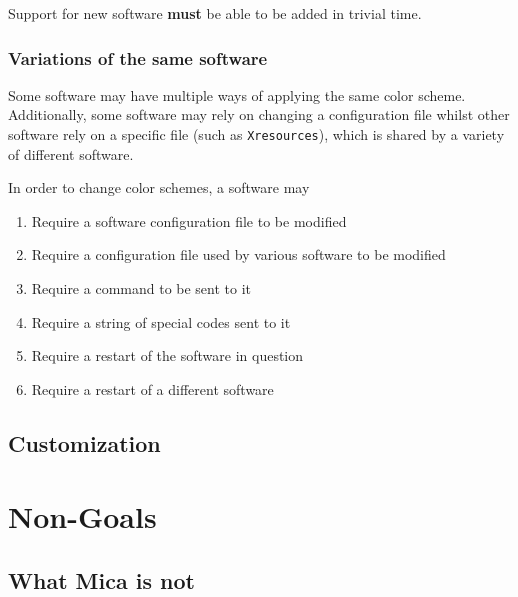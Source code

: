 \documentclass{article}
\theoremstyle{definition}
\begin{document}
    Support for new software \textbf{must} be able to be added in trivial time.

    \subsubsection{Variations of the same software}

    Some software may have multiple ways of applying the same color scheme. Additionally, some software may rely on changing a configuration file whilst other software rely on a specific file (such as \texttt{Xresources}), which is shared by a variety of different software.

    In order to change color schemes, a software may

    \begin{enumerate}
        \item Require a software configuration file to be modified
        \item Require a configuration file used by various software to be modified
        \item Require a command to be sent to it
        \item Require a string of special codes sent to it
        \item Require a restart of the software in question
        \item Require a restart of a different software
    \end{enumerate}

    \subsection{Customization}

    \newpage


    \section{Non-Goals}

    \subsection{What Mica is not}
\end{document}

